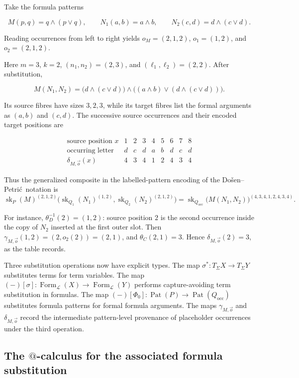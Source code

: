 \documentclass[11pt]{article}
\makeatletter
\newcommand{\atsign}{\mathord{@}}
\newcommand{\DP}{Do\v{s}en--Petri\'{c}}
\theoremstyle{definition}
\makeatother
\begin{document}
Take the formula patterns

\[
M(p,q)=q\wedge(p\vee q),\qquad
N_1(a,b)=a\wedge b,
\qquad
N_2(c,d)=d\wedge(c\vee d).
\]

Reading occurrences from left to right yields
\(o_M=(2,1,2)\), \(o_1=(1,2)\), and \(o_2=(2,1,2)\).

Here \(m=3\), \(k=2\), \((n_1,n_2)=(2,3)\), and
\((\ell_1,\ell_2)=(2,2)\). After substitution,

\[
M(N_1,N_2)
=\bigl(d\wedge(c\vee d)\bigr)
 \wedge
 \bigl((a\wedge b)\vee(d\wedge(c\vee d))\bigr).
\]

Its source fibres have sizes \(3,2,3\), while its target fibres list the
formal arguments as \((a,b)\) and \((c,d)\). The successive source
occurrences and their encoded target positions are

\[
\begin{array}{c|ccc|cc|ccc}
\text{source position }x&1&2&3&4&5&6&7&8\\ \hline
\text{occurring letter}&d&c&d&a&b&d&c&d\\
\delta_{M,\vec o}(x)&4&3&4&1&2&4&3&4
\end{array}
\]

Thus the generalized composite in the labelled-pattern encoding of the
\DP\ notation is
\[
\operatorname{sk}_P(M)^{(2,1,2)}
\bigl(\operatorname{sk}_{Q_1}(N_1)^{(1,2)},
      \operatorname{sk}_{Q_2}(N_2)^{(2,1,2)}\bigr)
=\operatorname{sk}_{Q_{\mathrm{occ}}}
 \bigl(M(N_1,N_2)\bigr)^{(4,3,4,1,2,4,3,4)}.
\]

For instance, \(\theta_D^{-1}(2)=(1,2)\): source position \(2\) is the
second occurrence inside the copy of \(N_2\) inserted at the first outer
slot. Then
\(\gamma_{M,\vec o}(1,2)=(2,o_2(2))=(2,1)\), and
\(\theta_C(2,1)=3\). Hence \(\delta_{M,\vec o}(2)=3\), as the table records.

Three substitution operations now have explicit types.
The map \(\sigma^*:T_\Sigma X\to T_\Sigma Y\) substitutes terms for term
variables. The map
\((-)[\sigma]:\operatorname{Form}_{\mathcal L}(X)\to
\operatorname{Form}_{\mathcal L}(Y)\) performs capture-avoiding term
substitution in formulas. The map
\((-)[\Phi_0]:\operatorname{Pat}(P)\to
\operatorname{Pat}(Q_{\mathrm{occ}})\) substitutes
formula patterns for formal formula arguments. The maps
\(\gamma_{M,\vec o}\) and \(\delta_{M,\vec o}\) record the intermediate
pattern-level provenance of placeholder occurrences under the third operation.

\subsection{The \texorpdfstring{$\atsign$}{@}-calculus for the associated
formula substitution}
\end{document}
